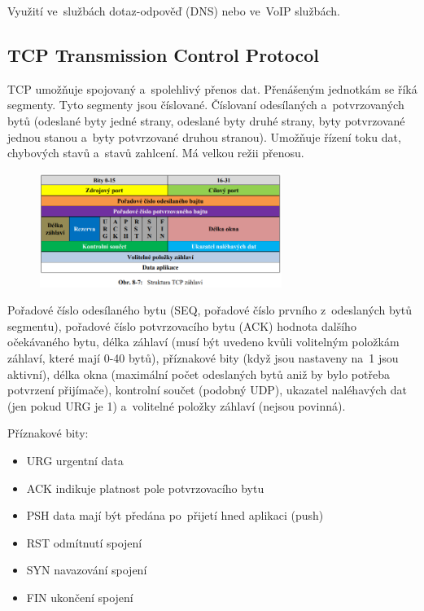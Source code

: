 Využití ve~službách dotaz-odpověď (DNS) nebo ve~VoIP službách.

\subsection{TCP Transmission Control Protocol}

TCP umožňuje spojovaný a~spolehlivý přenos dat. Přenášeným jednotkám se říká segmenty. Tyto segmenty jsou číslované. Číslovaní odesílaných a~potvrzovaných bytů (odeslané byty jedné strany, odeslané byty druhé strany, byty potvrzované jednou stanou a~byty potvrzované druhou stranou). Umožňuje řízení toku dat, chybových stavů a~stavů zahlcení. Má velkou režii přenosu.

\begin{figure}[!h]
    \centering
    \includegraphics[width=0.7\textwidth]{obrazky/031.png}
\end{figure}

Pořadové číslo odesílaného bytu (SEQ, pořadové číslo prvního z~odeslaných bytů segmentu), pořadové číslo potvrzovacího bytu (ACK) hodnota dalšího očekávaného bytu, délka záhlaví (musí být uvedeno kvůli volitelným položkám záhlaví, které mají 0-40 bytů), příznakové bity (když jsou nastaveny na~1 jsou aktivní), délka okna (maximální počet odeslaných bytů aniž by bylo potřeba potvrzení přijímače), kontrolní součet (podobný UDP), ukazatel naléhavých dat (jen pokud URG je 1) a~volitelné položky záhlaví (nejsou povinná).

\vspace{1.5cm} %
Příznakové bity:
\begin{itemize}[noitemsep]
    \item URG urgentní data
    \item ACK indikuje platnost pole potvrzovacího bytu
    \item PSH data mají být předána po~přijetí hned aplikaci (push)
    \item RST odmítnutí spojení
    \item SYN navazování spojení
    \item FIN ukončení spojení
\end{itemize}

